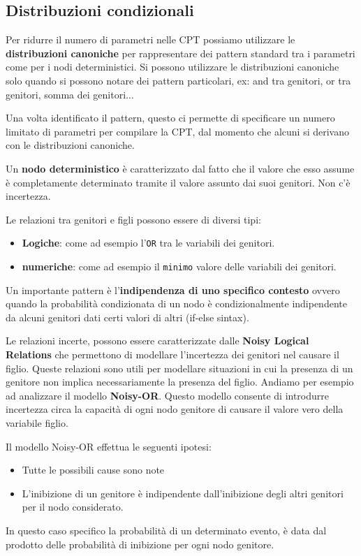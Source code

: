 \subsection{Distribuzioni condizionali}
Per ridurre il numero di parametri nelle CPT possiamo utilizzare le \textbf{distribuzioni
    canoniche} per rappresentare dei pattern standard tra i parametri come per
i nodi deterministici. Si possono utilizzare le distribuzioni canoniche solo
quando si possono notare dei pattern particolari, ex: and tra genitori, or tra
genitori, somma dei genitori$\dots$

Una volta identificato il pattern, questo ci permette di specificare un numero 
limitato di parametri per compilare la CPT, dal momento che alcuni si derivano 
con le distribuzioni canoniche.
\begin{definizione}
    Un \textbf{nodo deterministico} è caratterizzato dal fatto che il valore che
    esso assume è completamente determinato tramite il valore assunto dai suoi
    genitori. Non c'è incertezza.
\end{definizione}
Le relazioni tra genitori e figli possono essere di diversi tipi:
\begin{itemize}
    \item \textbf{Logiche}: come ad esempio l'\texttt{OR} tra le variabili dei genitori.
    \item \textbf{numeriche}: come ad esempio il \texttt{minimo} valore delle
          variabili dei genitori.
\end{itemize}
Un importante pattern è l'\textbf{indipendenza di uno specifico contesto} ovvero
quando la probabilità condizionata di un nodo è condizionalmente indipendente
da alcuni genitori dati certi valori di altri (if-else sintax).

Le relazioni incerte, possono essere caratterizzate dalle \textbf{Noisy Logical
    Relations} che permettono di modellare l'incertezza dei genitori nel causare
il figlio. Queste relazioni sono utili per modellare situazioni in cui la presenza
di un genitore non implica necessariamente la presenza del figlio.
Andiamo per esempio ad analizzare il modello \textbf{Noisy-OR}. Questo modello 
consente di introdurre incertezza circa la capacità di ogni nodo genitore di 
causare il valore vero della variabile figlio. 

Il modello Noisy-OR effettua le seguenti ipotesi:
\begin{itemize}
    \item Tutte le possibili cause sono note
    \item L'inibizione di un genitore è indipendente dall'inibizione degli altri
          genitori per il nodo considerato.
\end{itemize}
In questo caso specifico la probabilità di un determinato evento, è data dal 
prodotto delle probabilità di inibizione per ogni nodo genitore.
